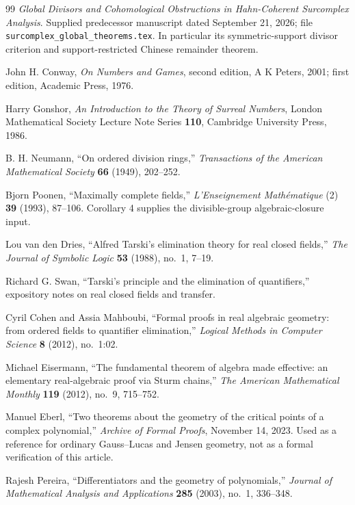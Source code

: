\documentclass[11pt,letterpaper]{article}
\numberwithin{equation}{section}
\theoremstyle{definition}
\theoremstyle{remark}\newtheorem{remark}[theorem]{Remark}
\begin{document}
\begin{thebibliography}{99}
\emph{Global Divisors and Cohomological Obstructions in Hahn-Coherent
Surcomplex Analysis}. Supplied predecessor manuscript dated September 21, 2026;
file \texttt{surcomplex\_global\_theorems.tex}. In particular its
symmetric-support divisor criterion and support-restricted Chinese remainder
theorem.

John H. Conway, \emph{On Numbers and Games}, second edition, A K Peters, 2001;
first edition, Academic Press, 1976.

Harry Gonshor, \emph{An Introduction to the Theory of Surreal Numbers}, London
Mathematical Society Lecture Note Series \textbf{110}, Cambridge University
Press, 1986.

B. H. Neumann, ``On ordered division rings,'' \emph{Transactions of the
American Mathematical Society} \textbf{66} (1949), 202--252.

Bjorn Poonen, ``Maximally complete fields,'' \emph{L'Enseignement
Math\'ematique} (2) \textbf{39} (1993), 87--106. Corollary 4 supplies the
divisible-group algebraic-closure input.

Lou van den Dries, ``Alfred Tarski's elimination theory for real closed
fields,'' \emph{The Journal of Symbolic Logic} \textbf{53} (1988), no.~1,
7--19.

Richard G. Swan, ``Tarski's principle and the elimination of quantifiers,''
expository notes on real closed fields and transfer.

Cyril Cohen and Assia Mahboubi, ``Formal proofs in real algebraic geometry:
from ordered fields to quantifier elimination,'' \emph{Logical Methods in
Computer Science} \textbf{8} (2012), no.~1:02.

Michael Eisermann, ``The fundamental theorem of algebra made effective: an
elementary real-algebraic proof via Sturm chains,'' \emph{The American
Mathematical Monthly} \textbf{119} (2012), no.~9, 715--752.

Manuel Eberl, ``Two theorems about the geometry of the critical points of a
complex polynomial,'' \emph{Archive of Formal Proofs}, November 14, 2023. Used
as a reference for ordinary Gauss--Lucas and Jensen geometry, not as a formal
verification of this article.

Rajesh Pereira, ``Differentiators and the geometry of polynomials,''
\emph{Journal of Mathematical Analysis and Applications} \textbf{285} (2003),
no.~1, 336--348.


\end{thebibliography}
\end{document}
